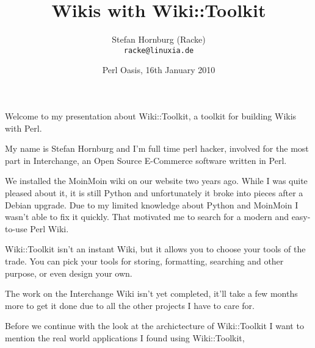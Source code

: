 
\usepackage[T1]{fontenc}
\usepackage{mathptmx}
\usepackage[scaled=.90]{helvet}
\usepackage{courier}

\usepackage{beamerthemesplit}
\usepackage{verbatim}
\usepackage{hyperref}
\usepackage{listings}
\lstset{language=Perl,basicstyle=\footnotesize,tabsize=3}


\title{Wikis with Wiki::Toolkit}
\author[racke]{Stefan Hornburg (Racke)\\ \texttt{racke@linuxia.de}}
\date[OPW2010]{Perl Oasis, 16th January 2010}



\begin{frame}
  \titlepage
\end{frame}

\tableofcontents

Welcome to my presentation about Wiki::Toolkit, a toolkit for building
Wikis with Perl.

My name is Stefan Hornburg and I'm full time perl hacker, involved for
the most part in Interchange, an Open Source E-Commerce software 
written in Perl.

We installed the MoinMoin wiki on our website two years ago. While I was
quite pleased about it, it is still Python and unfortunately it broke 
into pieces after a Debian upgrade. Due to my limited knowledge about
Python and MoinMoin I wasn't able to fix it quickly.
That motivated me to search for a modern and easy-to-use Perl Wiki.

Wiki::Toolkit isn't an instant Wiki, but it allows you to choose
your tools of the trade. You can pick your tools for storing, formatting,
searching and other purpose, or even design your own.

The work on the Interchange Wiki isn't yet completed, it'll take a few
months more to get it done due to all the other projects I have to care
for.

Before we continue with the look at the archictecture of Wiki::Toolkit
I want to mention the real world applications I found using Wiki::Toolkit,

